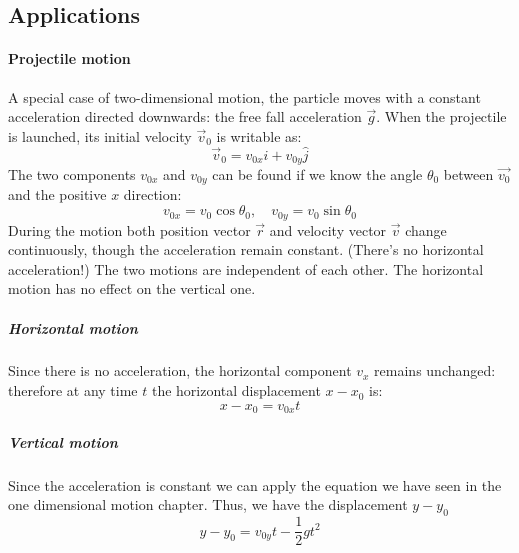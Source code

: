 \documentclass{scrartcl}
\begin{document}
    \subsection{Applications}
    \paragraph{Projectile motion} A special case of two-dimensional motion, the particle moves with a constant acceleration directed downwards: the free fall acceleration $\vec{g}$. When the projectile is launched, its initial velocity $\vec{v}_0$ is writable as: 
    \begin{equation}
        \vec{v}_0 = v_{0x} \hat{i} + v_{0y} \hat{j}
    \end{equation}
    The two components $v_{0x}$ and $v_{0y}$ can be found if we know the angle $\theta_0$ between $\vec{v_0}$ and the positive $x$ direction:
    \begin{equation}
        v_{0x} = v_0 \cos \theta_0,\quad v_{0y} = v_0\sin\theta_0
    \end{equation}
    During the motion both position vector $\vec{r}$ and velocity vector $\vec{v}$ change continuously, though the acceleration remain constant. (There's no horizontal acceleration!)
    The two motions are independent of each other. The horizontal motion has no effect on the vertical one.
    
    \subparagraph{Horizontal motion} Since there is no acceleration, the horizontal component $v_x$ remains unchanged: therefore at any time $t$ the horizontal displacement $x - x_0$ is:
    \begin{equation}\label{eq:hor_motion}
        x - x_0 = v_{0x}t
    \end{equation}
    
    \subparagraph{Vertical motion} Since the acceleration is constant we can apply the equation we have seen in the one dimensional motion chapter. Thus, we have the displacement $y- y_0$
    \begin{equation}\label{eq:ver_motion}
        y - y_0 = v_{0y}t - \frac{1}{2}gt^2
    \end{equation}
\end{document}
